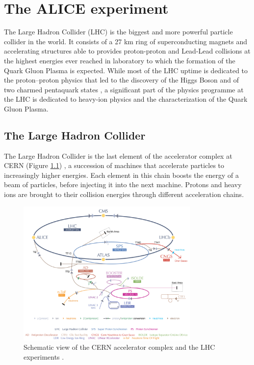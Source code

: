 %
\chapter{The ALICE experiment}
\label{sec:3}


The Large Hadron Collider (LHC) is the biggest and more powerful particle collider in the world.
It consists of a 27 km ring of superconducting magnets and accelerating structures able to
provides proton-proton and Lead-Lead collisions at the highest energies ever reached in laboratory
to which the formation of the Quark Gluon Plasma is expected.
While most of the LHC uptime is dedicated to the proton–proton physics that led to the discovery of 
the Higgs Boson \cite{atlashiggs,cmshiggs} and of two charmed pentaquark states \cite{lhcbpenta}, 
a significant part of the physics programme at the LHC is dedicated to heavy-ion physics and the 
characterization of the Quark Gluon Plasma.

\section{The Large Hadron Collider} \label{sec:3.1}

The Large Hadron Collider is the last element of the accelerator complex at CERN (Figure \ref{fig:lhc})
, a succession of machines that accelerate particles to increasingly higher energies. Each element in
this chain boosts the energy of a beam of particles, before injecting it into the next machine. 
Protons and heavy ions are brought to their collision energies through different acceleration chains.

\begin{figure}
    \centering
    \includegraphics[width=0.8\textwidth]{gfx/lhc}
	\caption{Schematic view of the CERN accelerator complex and the LHC experiments \cite{lhc}.}
	\label{fig:lhc}
\end{figure}

